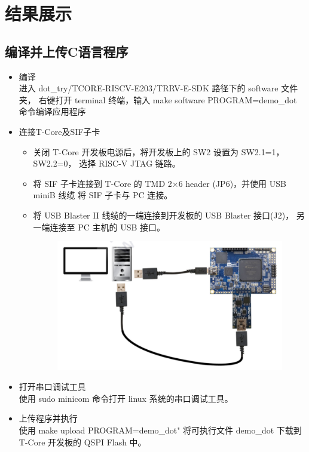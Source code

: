 \documentclass[a4paper, 14pt, oneside]{book} %
\numberwithin{equation}{subsection}
\begin{document}
	\section{结果展示}	
	\subsection{编译并上传C语言程序}
		\begin{itemize}
			\item{编译}\\
				进入 dot\_try/TCORE-RISCV-E203/TRRV-E-SDK 路径下的 software 文件夹，
				右键打开 terminal 终端，输入 make software PROGRAM=demo\_dot 命令编译应用程序
			\item{连接T-Core及SIF子卡}
				\begin{itemize}
					\item
						关闭 T-Core 开发板电源后，将开发板上的 SW2 设置为 SW2.1=1，SW2.2=0，
						选择 RISC-V JTAG 链路。
					\item
						将 SIF 子卡连接到 T-Core 的 TMD 2×6 header (JP6)，并使用 USB miniB 线缆
						将 SIF 子卡与 PC 连接。
					\item
						将 USB Blaster II 线缆的一端连接到开发板的 USB Blaster 接口(J2)，
						另一端连接至 PC 主机的 USB 接口。
						\begin{figure}[!htbp]
							\centering
							\includegraphics[scale=0.4]{img/connect.png}
						\end{figure}
				\end{itemize}	
			\item{打开串口调试工具}\\
				使用 sudo minicom 命令打开 linux 系统的串口调试工具。
			\item{上传程序并执行}\\
				使用 make upload PROGRAM=demo\_dot" 将可执行文件 demo\_dot 下载到 T-Core 开发板的 QSPI Flash 中。
		\end{itemize}
\end{document}
